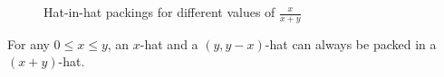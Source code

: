 \documentclass[%
    a4paper,              %
    style=print,          %
    bibliography=totoc,   %
    nexus,                %
    lnum,                 %
    extramargin,          %
]{tubsbook}
\begin{document}
\begin{figure}[tb]
    \centering


    \caption{Hat-in-hat packings for different values of $\frac{x}{x+y}$}
    \label{fig:hatsinhat}
\end{figure}

\begin{lemma}\label{th:hatsinhat}
    For any $0 \le x \le y$, an $x$-hat and a $(y,y-x)$-hat can always be packed in a $(x+y)$-hat.
\end{lemma}
\end{document}
